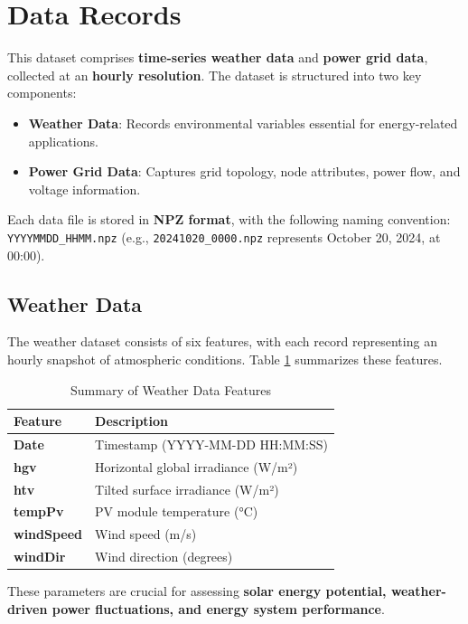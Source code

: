 \documentclass[12pt]{article}
\begin{document}
\section*{Data Records}

This dataset comprises \textbf{time-series weather data} and \textbf{power grid data}, collected at an \textbf{hourly resolution}. The dataset is structured into two key components:
\begin{itemize}
    \item \textbf{Weather Data}: Records environmental variables essential for energy-related applications.
    \item \textbf{Power Grid Data}: Captures grid topology, node attributes, power flow, and voltage information.
\end{itemize}
Each data file is stored in \textbf{NPZ format}, with the following naming convention: \texttt{YYYYMMDD\_HHMM.npz} (e.g., \texttt{20241020\_0000.npz} represents October 20, 2024, at 00:00).

\subsection*{Weather Data}
The weather dataset consists of six features, with each record representing an hourly snapshot of atmospheric conditions. Table \ref{tab:weather} summarizes these features.

\begin{table}[h]
    \centering
    \begin{tabular}{ll}
        \toprule
        \textbf{Feature} & \textbf{Description} \\
        \midrule
        \textbf{Date}  & Timestamp (YYYY-MM-DD HH:MM:SS) \\
        \textbf{hgv}   & Horizontal global irradiance (W/m²) \\
        \textbf{htv}   & Tilted surface irradiance (W/m²) \\
        \textbf{tempPv} & PV module temperature (°C) \\
        \textbf{windSpeed} & Wind speed (m/s) \\
        \textbf{windDir} & Wind direction (degrees) \\
        \bottomrule
    \end{tabular}
    \caption{Summary of Weather Data Features}
    \label{tab:weather}
\end{table}

These parameters are crucial for assessing \textbf{solar energy potential, weather-driven power fluctuations, and energy system performance}.
\end{document}
